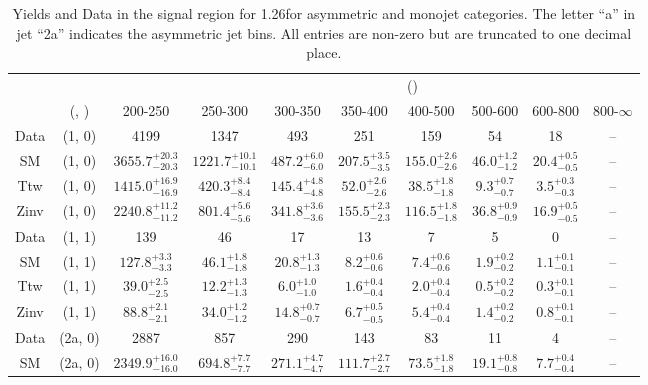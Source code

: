 \begin{table}[h!]
\tiny
\centering
\caption{Yields and Data in the signal region for 1.26\ifb for asymmetric and monojet categories. The letter ``a'' in jet \eg ``2a''  indicates the asymmetric jet bins. All entries are non-zero but are truncated to one decimal place.\label{tab:yieldsall_sig_comb_asym}}
\begin{tabular}
{cccccccccc}
	\hline\hline
&	&	& \multicolumn{8}{c}{\scalht (\gev)}\\ 
	&	 (\njet, \nb) & 200-250 & 250-300 & 300-350 & 350-400 & 400-500 & 500-600 & 600-800 & 800-$\infty$ \\ [0.8ex] 
\hline
	Data & (1, 0) & 4199 & 1347 & 493 & 251 & 159 & 54 & 18 & -- \\[0.5ex] 
	SM & (1, 0) & $3655.7^{+ 20.3 }_{- 20.3 }$ & $1221.7^{+ 10.1 }_{- 10.1 }$ & $487.2^{+ 6.0 }_{- 6.0 }$ & $207.5^{+ 3.5 }_{- 3.5 }$ & $155.0^{+ 2.6 }_{- 2.6 }$ & $46.0^{+ 1.2 }_{- 1.2 }$ & $20.4^{+ 0.5 }_{- 0.5 }$ & -- \\[0.5ex] 
	Ttw & (1, 0) & $1415.0^{+ 16.9 }_{- 16.9 }$ & $420.3^{+ 8.4 }_{- 8.4 }$ & $145.4^{+ 4.8 }_{- 4.8 }$ & $52.0^{+ 2.6 }_{- 2.6 }$ & $38.5^{+ 1.8 }_{- 1.8 }$ & $9.3^{+ 0.7 }_{- 0.7 }$ & $3.5^{+ 0.3 }_{- 0.3 }$ & -- \\[0.5ex] 
	Zinv & (1, 0) & $2240.8^{+ 11.2 }_{- 11.2 }$ & $801.4^{+ 5.6 }_{- 5.6 }$ & $341.8^{+ 3.6 }_{- 3.6 }$ & $155.5^{+ 2.3 }_{- 2.3 }$ & $116.5^{+ 1.8 }_{- 1.8 }$ & $36.8^{+ 0.9 }_{- 0.9 }$ & $16.9^{+ 0.5 }_{- 0.5 }$ & -- \\[0.5ex] 
	Data & (1, 1) & 139 & 46 & 17 & 13 & 7 & 5 & 0 & -- \\[0.5ex] 
	SM & (1, 1) & $127.8^{+ 3.3 }_{- 3.3 }$ & $46.1^{+ 1.8 }_{- 1.8 }$ & $20.8^{+ 1.3 }_{- 1.3 }$ & $8.2^{+ 0.6 }_{- 0.6 }$ & $7.4^{+ 0.6 }_{- 0.6 }$ & $1.9^{+ 0.2 }_{- 0.2 }$ & $1.1^{+ 0.1 }_{- 0.1 }$ & -- \\[0.5ex] 
	Ttw & (1, 1) & $39.0^{+ 2.5 }_{- 2.5 }$ & $12.2^{+ 1.3 }_{- 1.3 }$ & $6.0^{+ 1.0 }_{- 1.0 }$ & $1.6^{+ 0.4 }_{- 0.4 }$ & $2.0^{+ 0.4 }_{- 0.4 }$ & $0.5^{+ 0.2 }_{- 0.2 }$ & $0.3^{+ 0.1 }_{- 0.1 }$ & -- \\[0.5ex] 
	Zinv & (1, 1) & $88.8^{+ 2.1 }_{- 2.1 }$ & $34.0^{+ 1.2 }_{- 1.2 }$ & $14.8^{+ 0.7 }_{- 0.7 }$ & $6.7^{+ 0.5 }_{- 0.5 }$ & $5.4^{+ 0.4 }_{- 0.4 }$ & $1.4^{+ 0.2 }_{- 0.2 }$ & $0.8^{+ 0.1 }_{- 0.1 }$ & -- \\[0.5ex] 
	Data & (2a, 0) & 2887 & 857 & 290 & 143 & 83 & 11 & 4 & -- \\[0.5ex] 
	SM & (2a, 0) & $2349.9^{+ 16.0 }_{- 16.0 }$ & $694.8^{+ 7.7 }_{- 7.7 }$ & $271.1^{+ 4.7 }_{- 4.7 }$ & $111.7^{+ 2.7 }_{- 2.7 }$ & $73.5^{+ 1.8 }_{- 1.8 }$ & $19.1^{+ 0.8 }_{- 0.8 }$ & $7.7^{+ 0.4 }_{- 0.4 }$ & -- \\[0.5ex] 

\end{tabular}
\end{table}
